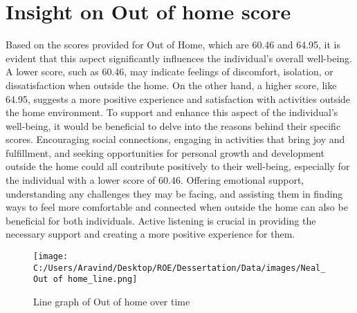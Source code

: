 \documentclass[10pt, a4paper]{article}%
\begin{document}
%
\section{Insight on Out of home score}%
\label{sec:InsightonOutofhomescore}%
Based on the scores provided for Out of Home, which are 60.46 and 64.95, it is evident that this aspect significantly influences the individual's overall well{-}being. A lower score, such as 60.46, may indicate feelings of discomfort, isolation, or dissatisfaction when outside the home. On the other hand, a higher score, like 64.95, suggests a more positive experience and satisfaction with activities outside the home environment.\newline%
\newline%
To support and enhance this aspect of the individual's well{-}being, it would be beneficial to delve into the reasons behind their specific scores. Encouraging social connections, engaging in activities that bring joy and fulfillment, and seeking opportunities for personal growth and development outside the home could all contribute positively to their well{-}being, especially for the individual with a lower score of 60.46.\newline%
\newline%
Offering emotional support, understanding any challenges they may be facing, and assisting them in finding ways to feel more comfortable and connected when outside the home can also be beneficial for both individuals. Active listening is crucial in providing the necessary support and creating a more positive experience for them.%


\begin{figure}[H]%
\centering%
\texttt{[image: C:/Users/Aravind/Desktop/ROE/Dessertation/Data/images/Neal\_Out of home\_line.png]}%
\caption{Line graph of Out of home over time}%
\end{figure}

%
\end{document}
